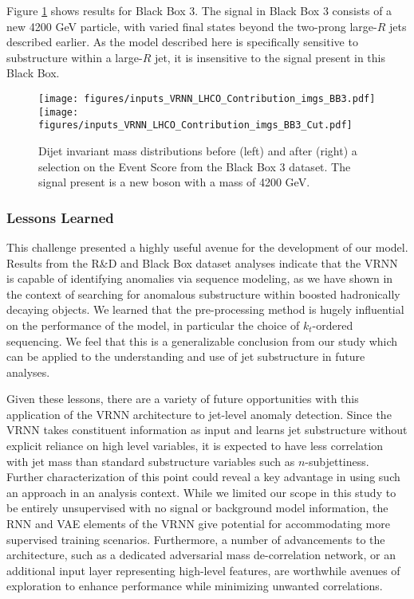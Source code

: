 \documentclass[a4paper,11pt]{article}
\begin{document}
Figure \ref{fig:bb3} shows results for Black Box 3. The signal in Black Box 3 consists of a new 4200 GeV particle, with varied final states beyond the two-prong large-$R$ jets described earlier. As the model described here is specifically sensitive to substructure within a large-$R$ jet, it is insensitive to the signal present in this Black Box. 

\begin{figure}[H]
	\begin{center}
		\texttt{[image: figures/inputs\_VRNN\_LHCO\_Contribution\_imgs\_BB3.pdf]}
		\texttt{[image: figures/inputs\_VRNN\_LHCO\_Contribution\_imgs\_BB3\_Cut.pdf]}
	\end{center}
	\caption{Dijet invariant mass distributions before (left) and after (right) a selection on the Event Score from the Black Box 3 dataset. The signal present is a new boson with a mass of 4200 GeV.}
	\label{fig:bb3}
\end{figure}


\subsubsection{Lessons Learned}
\label{sec:lessons}



This challenge presented a highly useful avenue for the development of our model. 
Results from the R\&D and Black Box dataset analyses indicate that the VRNN is capable of identifying anomalies via sequence modeling, as we have shown in the context of searching for anomalous substructure within boosted hadronically decaying objects.
We learned that the pre-processing method is hugely influential on the performance of the model, in particular the choice of $k_{t}$-ordered sequencing. 
We feel that this is a generalizable conclusion from our study which can be applied to the understanding and use of jet substructure in future analyses.

Given these lessons, there are a variety of future opportunities with this application of the VRNN architecture to jet-level anomaly detection. 
Since the VRNN takes constituent information as input and learns jet substructure without explicit reliance on high level variables, it is expected to have less correlation with jet mass than standard substructure variables such as $n$-subjettiness. Further characterization of this point could reveal a key advantage in using such an approach in an analysis context.
While we limited our scope in this study to be entirely unsupervised with no signal or background model information, the RNN and VAE elements of the VRNN give potential for accommodating more supervised training scenarios. 
Furthermore, a number of advancements to the architecture, such as a dedicated adversarial mass de-correlation network, or an additional input layer representing high-level features, are worthwhile avenues of exploration to enhance performance while minimizing unwanted correlations. 
 \FloatBarrier
\end{document}
